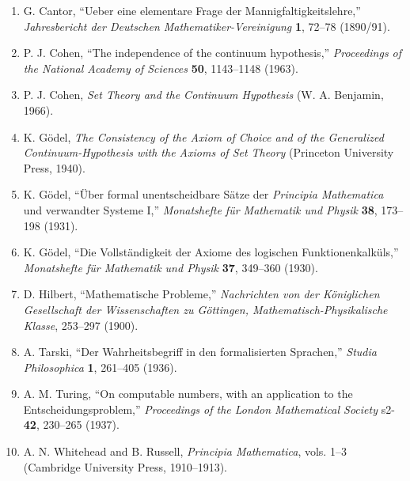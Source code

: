\documentclass[12pt]{article}
\begin{document}
    \begin{enumerate}
        \item G. Cantor, ``Ueber eine elementare Frage der
        Mannigfaltigkeitslehre,'' \emph{Jahresbericht der Deutschen
        Mathematiker-Vereinigung} \textbf{1}, 72--78 (1890/91).

        \item P. J. Cohen, ``The independence of the continuum hypothesis,''
        \emph{Proceedings of the National Academy of Sciences} \textbf{50},
        1143--1148 (1963).

        \item P. J. Cohen, \emph{Set Theory and the Continuum Hypothesis}
        (W. A. Benjamin, 1966).

        \item K. G\"odel, \emph{The Consistency of the Axiom of Choice and of the
        Generalized Continuum-Hypothesis with the Axioms of Set Theory}
        (Princeton University Press, 1940).

        \item K. G\"odel, ``\"Uber formal unentscheidbare S\"atze der
        \emph{Principia Mathematica} und verwandter Systeme I,''
        \emph{Monatshefte f\"ur Mathematik und Physik} \textbf{38}, 173--198
        (1931).

        \item K. G\"odel, ``Die Vollst\"andigkeit der Axiome des logischen
        Funktionenkalk\"uls,'' \emph{Monatshefte f\"ur Mathematik und Physik}
        \textbf{37}, 349--360 (1930).

        \item D. Hilbert, ``Mathematische Probleme,'' \emph{Nachrichten von der
        K\"oniglichen Gesellschaft der Wissenschaften zu G\"ottingen,
            Mathematisch-Physikalische Klasse}, 253--297 (1900).

        \item A. Tarski, ``Der Wahrheitsbegriff in den formalisierten Sprachen,''
        \emph{Studia Philosophica} \textbf{1}, 261--405 (1936).

        \item A. M. Turing, ``On computable numbers, with an application to the
        Entscheidungsproblem,'' \emph{Proceedings of the London Mathematical
        Society} s2-\textbf{42}, 230--265 (1937).

        \item A. N. Whitehead and B. Russell, \emph{Principia Mathematica},
        vols. 1--3 (Cambridge University Press, 1910--1913).
    \end{enumerate}
\end{document}
